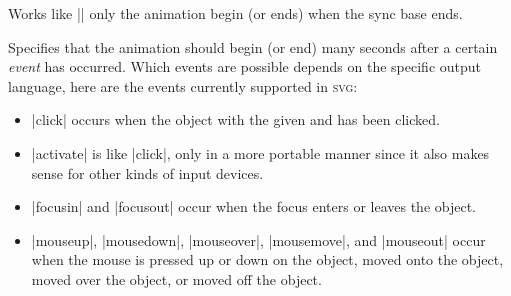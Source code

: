 \begin{command}{\pgfsys@animation@syncend{}}
  Works like |\pgfsys@animation@syncbegin| only the animation begin
  (or ends) when the sync base ends.
\end{command}

\begin{command}{\pgfsys@animation@event{}}
  Specifies that the animation should begin (or end)  many seconds after a certain \emph{event} has
  occurred. Which events are possible depends on the specific output
  language, here are the events currently supported in \textsc{svg}:
  \begin{itemize}
  \item |click| occurs when the object with the given  and
     has been clicked.
  \item |activate| is like |click|, only in a more portable manner
    since it also makes sense for other kinds of input devices.
  \item |focusin| and |focusout| occur when the focus enters or leaves
    the object.
  \item |mouseup|, |mousedown|, |mouseover|, |mousemove|, and
    |mouseout| occur when the mouse is pressed up or down on the
    object, moved onto the object, moved over the object, or moved off
    the object.
  \end{itemize}
\begin{codeexample}[width=2cm]
\end{codeexample}
\begin{codeexample}[width=2cm]
\end{codeexample}
\begin{codeexample}[width=2cm]
\end{codeexample}
\begin{codeexample}[width=2cm]
\end{codeexample}
\begin{codeexample}[width=2cm]
\end{codeexample}
\end{command}

